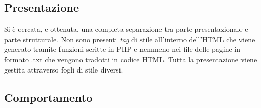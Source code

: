 \subsection{Presentazione}
Si è cercata, e ottenuta, una completa separazione tra parte presentazionale e parte strutturale. Non sono presenti \textit{tag} di stile all’interno dell'HTML che viene generato tramite funzioni scritte in PHP e nemmeno nei file delle pagine in formato .txt che vengono tradotti in codice HTML. 
Tutta la presentazione viene gestita attraverso fogli di stile diversi. 

\subsection{Comportamento}


